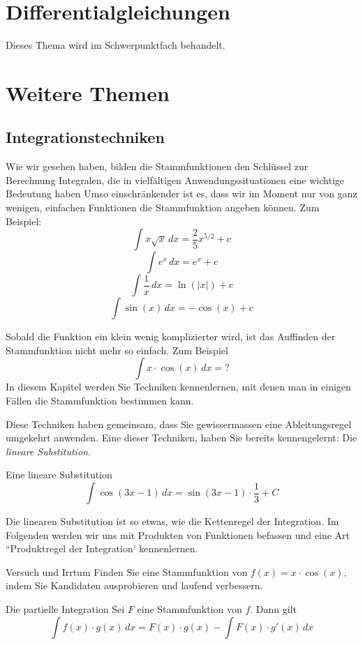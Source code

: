\section{Differentialgleichungen}
Dieses Thema wird im Schwerpunktfach behandelt.
\section{Weitere Themen}
\subsection*{Integrationstechniken}
Wie wir gesehen haben, bilden die Stammfunktionen den Schlüssel zur Berechnung Integralen, die in vielfältigen Anwendungssituationen eine wichtige Bedeutung haben Umso einschränkender ist es, dass wir im Moment nur von ganz wenigen, einfachen Funktionen die Stammfunktion angeben können. Zum Beispiel:
\[
\int x\sqrt{x} \,dx = \frac{2}{5}x^{5/2} + c
\]
\[
\int e^x \,dx = e^x + c
\]
\[
\int \frac{1}{x} \,dx = \ln(|x|) + c
\]
\[
\int \sin(x) \,dx = -\cos(x) + c
\]

Sobald die Funktion ein klein wenig komplizierter wird, ist das Auffinden der Stammfunktion nicht mehr so einfach. Zum Beispiel
\[
\int x \cdot \cos(x) \,dx = ?
\]
In diesem Kapitel werden Sie Techniken kennenlernen, mit denen man in einigen Fällen die Stammfunktion bestimmen kann.

Diese Techniken haben gemeinsam, dass Sie gewissermassen eine Ableitungsregel umgekehrt anwenden. Eine dieser Techniken, haben Sie bereits kennengelernt: Die \emph{lineare Substitution}.

\begin{bsp}
    {Eine lineare Substitution}{}
    $$\int \cos(3x-1) \, dx = \sin(3x-1) \cdot \frac{1}{3} + C$$
\end{bsp}

Die linearen Substitution ist so etwas, wie die Kettenregel der Integration. Im Folgenden  werden wir uns mit Produkten von Funktionen befassen und eine Art ``Produktregel der Integration' kennenlernen.

\begin{LA}
    {Versuch und Irrtum}{}
    Finden Sie eine Stammfunktion von $f(x) = x\cdot \cos(x)$, indem Sie Kandidaten ausprobieren und laufend verbessern.
\end{LA}
 
\clearpage
\begin{satz}
    {Die partielle Integration}{}
    Sei $F$ eine Stammfunktion von $f$. Dann gilt
    $$ \int f(x)\cdot g(x) \, dx = F(x)\cdot g(x) - \int F(x) \cdot g'(x) \, dx$$
\end{satz}

